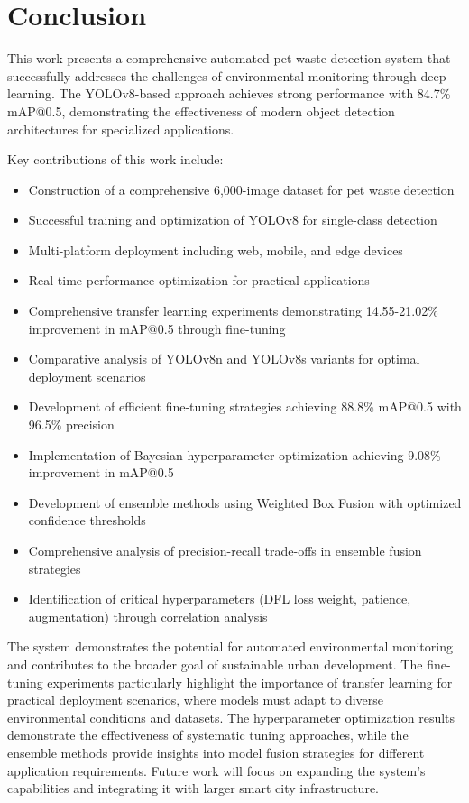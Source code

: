 \documentclass[12pt,a4paper]{article}
\begin{document}
\section{Conclusion}

This work presents a comprehensive automated pet waste detection system that successfully addresses the challenges of environmental monitoring through deep learning. The YOLOv8-based approach achieves strong performance with 84.7\% mAP@0.5, demonstrating the effectiveness of modern object detection architectures for specialized applications.

Key contributions of this work include:
\begin{itemize}
    \item Construction of a comprehensive 6,000-image dataset for pet waste detection
    \item Successful training and optimization of YOLOv8 for single-class detection
    \item Multi-platform deployment including web, mobile, and edge devices
    \item Real-time performance optimization for practical applications
    \item Comprehensive transfer learning experiments demonstrating 14.55-21.02\% improvement in mAP@0.5 through fine-tuning
    \item Comparative analysis of YOLOv8n and YOLOv8s variants for optimal deployment scenarios
    \item Development of efficient fine-tuning strategies achieving 88.8\% mAP@0.5 with 96.5\% precision
    \item Implementation of Bayesian hyperparameter optimization achieving 9.08\% improvement in mAP@0.5
    \item Development of ensemble methods using Weighted Box Fusion with optimized confidence thresholds
    \item Comprehensive analysis of precision-recall trade-offs in ensemble fusion strategies
    \item Identification of critical hyperparameters (DFL loss weight, patience, augmentation) through correlation analysis
\end{itemize}

The system demonstrates the potential for automated environmental monitoring and contributes to the broader goal of sustainable urban development. The fine-tuning experiments particularly highlight the importance of transfer learning for practical deployment scenarios, where models must adapt to diverse environmental conditions and datasets. The hyperparameter optimization results demonstrate the effectiveness of systematic tuning approaches, while the ensemble methods provide insights into model fusion strategies for different application requirements. Future work will focus on expanding the system's capabilities and integrating it with larger smart city infrastructure.
\end{document}
